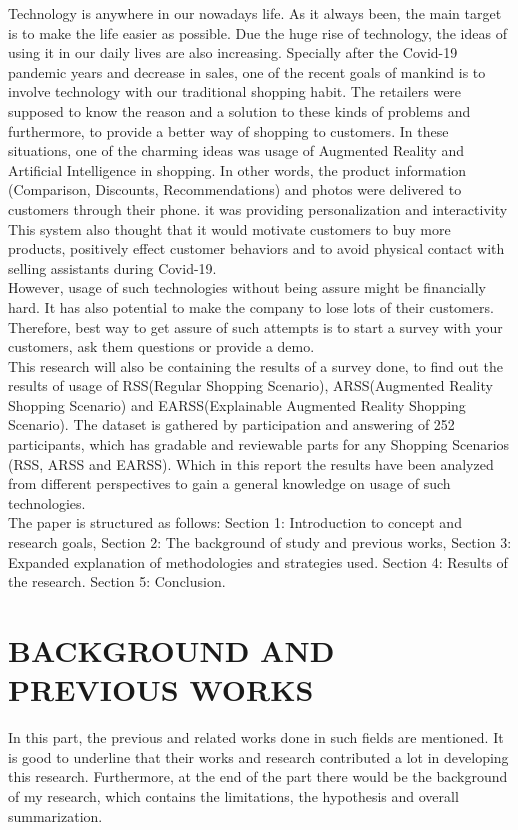 \documentclass[letterpaper, 10 pt, conference]{ieeeconf}
\begin{document}
Technology is anywhere in our nowadays life. As it always been, the main target is to make the life easier as possible. Due the huge rise of technology, the ideas of using it in our daily lives are also increasing. Specially after the Covid-19 pandemic years and decrease in sales, one of the recent goals of mankind is to involve technology with our traditional shopping habit. The retailers were supposed to know the reason and a solution to these kinds of problems and furthermore, to provide a better way of shopping  to customers. In these situations, one of the charming ideas was usage of Augmented Reality and Artificial Intelligence in shopping. In other words, the product information (Comparison, Discounts, Recommendations) and photos were delivered to customers through their phone. it was providing personalization and interactivity  This system also thought that it would motivate customers to buy more products, positively effect customer behaviors and to avoid physical contact with selling assistants during Covid-19.\\ 
However, usage of such technologies without being assure might be financially hard. It has also potential to make the company to lose lots of their customers. Therefore,  best way to get assure of such attempts is to start a survey with your customers, ask them questions or provide a demo.\\
This research will also be containing the results of a survey done, to find out the results of usage of RSS(Regular Shopping Scenario), ARSS(Augmented Reality Shopping Scenario) and EARSS(Explainable Augmented Reality Shopping Scenario). The dataset is gathered by participation and answering of 252 participants, which has gradable and reviewable parts for any Shopping Scenarios (RSS, ARSS and EARSS). Which in this report the results have been analyzed from different perspectives to gain a general knowledge on usage of such technologies.\\
The paper is structured as follows: Section 1: Introduction to concept and research goals, Section 2: The background of study and previous works, Section 3: Expanded explanation of methodologies and strategies used. Section 4: Results of the research. Section 5: Conclusion.


\section{BACKGROUND AND PREVIOUS WORKS}
In this part, the previous and related works done in such fields are mentioned. It is good to underline that their works and research contributed a lot in developing this research. Furthermore, at the end of the part there would be the background of my research, which contains the limitations, the hypothesis and overall summarization. 
\end{document}
